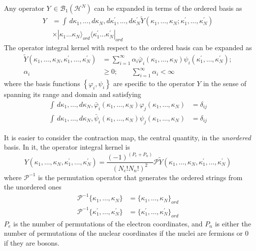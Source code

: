 \documentclass[aps,preprint]{revtex4}%
\begin{document}
Any operator $Y\,\in\mathcal{B}_{1}(\mathcal{H}^{N})$ can be expanded in terms
of the ordered basis as
\begin{align}
Y  &  =\int\,d\kappa_{1},\ldots,d\kappa_{N},d\kappa_{1}^{\prime}%
,\ldots,d\kappa_{N}^{\prime}\tilde{Y}(\kappa_{1},\ldots,\kappa_{N};\kappa
_{1}^{\prime},\ldots,\kappa_{N}^{\prime})\nonumber\\
&  \times|\kappa_{1}\ldots\kappa_{N}\rangle_{ord}\langle\kappa_{1}^{\prime
}\ldots\kappa_{N}^{\prime}|_{ord}%
\end{align}
The operator integral kernel with respect to the ordered basis can be expanded
\cite{Richtmyer} as
\begin{align}
\tilde{Y}(\kappa_{1},\ldots,\kappa_{N},\kappa_{1}^{\prime},\ldots,\kappa
_{N}^{\prime})  &  =\sum_{i=1}^{\infty}\alpha_{i}\bar{\varphi}_{i}(\kappa
_{1},\ldots,\kappa_{N})\psi_{i}(\kappa_{1}^{\prime},\ldots,\kappa_{N}^{\prime
});\nonumber\\
\alpha_{i}  &  \geq0; \qquad\sum_{i=1}^{\infty}\alpha_{i}<\infty
\end{align}
where the basis functions $\left\{  \varphi_{i},\psi_{i}\right\}  $ are
specific to the operator $Y$ in the sense of spanning its range and domain and
satisfying
\begin{align}
\int\,d\kappa_{1},\ldots,d\kappa_{N},\bar{\varphi}_{i}(\kappa_{1}%
,\ldots,\kappa_{N})\varphi_{j}(\kappa_{1},\ldots,\kappa_{N})  &  =\delta
_{ij}\nonumber\\
\int\,d\kappa_{1},\ldots,d\kappa_{N},\bar{\psi}_{i}(\kappa_{1},\ldots
,\kappa_{N})\psi_{j}(\kappa_{1},\ldots,\kappa_{N})  &  =\delta_{ij}%
\end{align}


It is easier to consider the contraction map, the central quantity, in the
\emph{unordered} basis. In it, the operator integral kernel is
\begin{equation}
Y(\kappa_{1},\ldots,\kappa_{N},\kappa_{1}^{\prime},\ldots,\kappa_{N}^{\prime
})=\frac{(-1)^{(P_{e}+P_{n})}}{(N_{e}!N_{n}!)^{2}}\mathcal{P}\tilde{Y}%
(\kappa_{1},\ldots,\kappa_{N},\kappa_{1}^{\prime},\ldots,\kappa_{N}^{\prime})
\end{equation}
where $\mathcal{P}^{-1}$ is the permutation operator that generates the
ordered strings from the unordered ones
\begin{align}
\mathcal{P}^{-1}\{\kappa_{1},\ldots,\kappa_{N}\}  &  =\{\kappa_{1}%
,\ldots,\kappa_{N}\}_{ord}\nonumber\\
\mathcal{P}^{-1}\{\kappa_{1}^{\prime},\ldots,\kappa_{N}^{\prime}\}  &
=\{\kappa_{1}^{\prime},\ldots,\kappa_{N}^{\prime}\}_{ord}%
\end{align}
$P_{e}$ is the number of permutations of the electron coordinates, and $P_{n}
$ is either the number of permutations of the nuclear coordinates if the
nuclei are fermions or $0$ if they are bosons.
\end{document}
